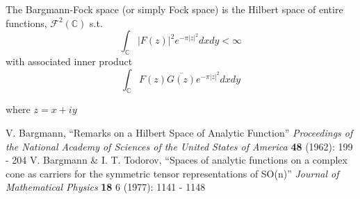 \documentclass[12pt]{article}
\begin{document}
The Bargmann-Fock space (or simply Fock space) is the Hilbert space of entire functions, $\mathcal{F}^2(\mathbb{C})$ s.t. 
$$ \int_\mathbb{C}|F(z)|^2 e^{- \pi |z|^2}dx dy<\infty$$
with associated inner product
$$ \int_\mathbb{C}F(z)\overline{G(z)}e^{- \pi |z|^2}dx dy$$

where $z=x+i y$


\begin{thebibliography}{2}
 V. Bargmann, ``Remarks on a Hilbert Space of Analytic Function'' {\it Proceedings of the National Academy of Sciences of the United States of America} {\bf 48} (1962): 199 - 204
 V. Bargmann \& I. T. Todorov, ``Spaces of analytic functions on a complex cone as carriers for the symmetric tensor representations of SO(n)'' {\it Journal of Mathematical Physics} {\bf 18} 6 (1977): 1141 - 1148
\end{thebibliography}
\end{document}
